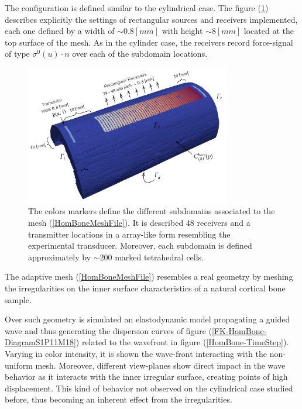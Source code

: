 The configuration is defined similar to the cylindrical case. The figure (\ref{HomBoneSubdomainsFile}) describes explicitly the settings of rectangular sources and receivers implemented, each one defined by a width of $\sim 0.8 [mm]$ with height $\sim 8 [mm]$ located at the top surface of the mesh. As in the cylinder case, the receivers record force-signal of type $\sigma^{0}(u)\cdot n$ over each of the subdomain locations.
\begin{figure}[!h]
	\centering
	\includegraphics[width=0.8\textwidth]{images/ImgExt/Cortical3dsc04Mesh1000Fill-MeshBoundaries.png}
	\caption{The colors markers define the different subdomains associated to the mesh (\ref{HomBoneMeshFile}). It is described $48$ receivers and a transmitter locations in a array-like form resembling the experimental transducer. Moreover, each subdomain is defined approximately by $\sim 200$ marked tetrahedral cells.}
	\label{HomBoneSubdomainsFile}
\end{figure} 
The adaptive mesh (\ref{HomBoneMeshFile}) resembles a real geometry by meshing the irregularities on the inner surface characteristics of a natural cortical bone sample. 

Over such geometry is simulated an elastodynamic model propagating a guided wave and thus generating the dispersion curves of figure (\ref{FK-HomBone-DiagramS1P11M18}) related to the wavefront in figure (\ref{HomBone-TimeStep}). Varying in color intensity, it is shown the wave-front interacting with the non-uniform mesh. Moreover, different view-planes show direct impact in the wave behavior as it interacts with the inner irregular surface, creating points of high displacement. This kind of behavior not observed on the cylindrical case studied before, thus becoming an inherent effect from the irregularities.

